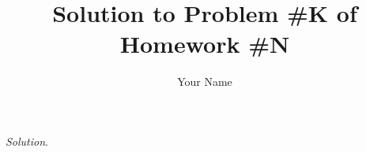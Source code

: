 \documentclass[12pt]{article}
\title{Solution to Problem \#K of Homework \#N}
\author{Your Name}
\begin{document}
\maketitle
\thispagestyle{fancyplain}
\flushleft 

{\it Solution}.\par
\smallskip
\end{document}
